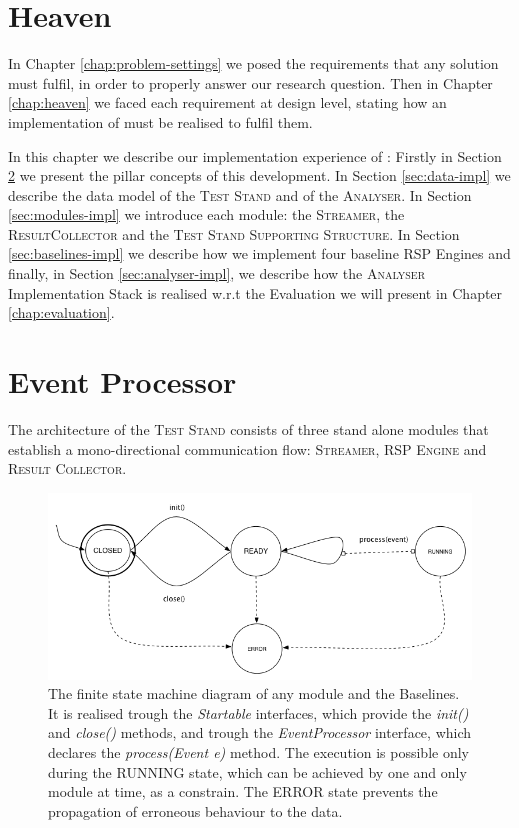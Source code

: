 \section{Heaven}\label{sec:impl-intro}

In Chapter \ref{chap:problem-settings} we posed the requirements that any solution must fulfil, in order to properly answer our research question. Then in Chapter \ref{chap:heaven} we faced each requirement at design level, stating how an implementation of \name must be realised to fulfil them. 

In this chapter we describe our implementation experience of \namens: 
Firstly in Section \ref{sec:abstractions} we present the pillar concepts of this development. In Section \ref{sec:data-impl} we describe the data model of the \textsc{Test Stand} and of the \textsc{Analyser}. In Section \ref{sec:modules-impl} we introduce each \name module: the \textsc{Streamer}, the \textsc{ResultCollector} and the \textsc{Test Stand Supporting Structure}. In Section \ref{sec:baselines-impl} we describe how we implement four baseline RSP Engines and finally, in Section \ref{sec:analyser-impl}, we describe how the \textsc{Analyser} Implementation Stack is realised w.r.t the Evaluation we will present in Chapter \ref{chap:evaluation}.

\section{Event Processor}\label{sec:abstractions}

The architecture of the \textsc{Test Stand} consists of three stand alone modules that establish a mono-directional communication flow: \textsc{Streamer}, \textsc{RSP Engine} and \textsc{Result Collector}. 

\begin{figure}[h!tb]
  \centering
	\includegraphics[width=\linewidth]{images/fsm-schema}
	\caption[\textit{EventProcessor} States Diagram]{The finite state machine diagram of any \name module and the Baselines. It is realised trough the \textit{Startable} interfaces, which provide the \textit{init()} and \textit{close() }methods, and trough the \textit{EventProcessor} interface, which declares the \textit{process(Event e)} method. The execution is possible only during the RUNNING state, which can be achieved by one and only module at time, as a constrain. The ERROR state prevents the propagation of erroneous behaviour to the data.}
  	\label{fig:module-fsm}
\end{figure}

